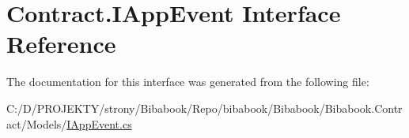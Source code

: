 \hypertarget{interface_contract_1_1_i_app_event}{}\section{Contract.\+I\+App\+Event Interface Reference}
\label{interface_contract_1_1_i_app_event}


The documentation for this interface was generated from the following file\+:\begin{DoxyCompactItemize}
\item 
C\+:/\+D/\+P\+R\+O\+J\+E\+K\+T\+Y/strony/\+Bibabook/\+Repo/bibabook/\+Bibabook/\+Bibabook.\+Contract/\+Models/\hyperlink{_i_app_event_8cs}{I\+App\+Event.\+cs}\end{DoxyCompactItemize}
